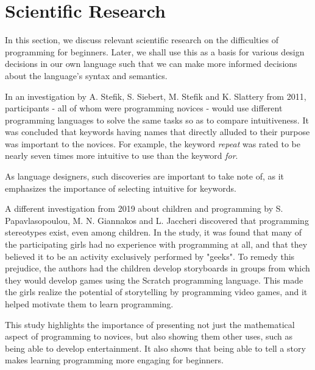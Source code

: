 \section{Scientific Research} \label{sec:scientific_research}
In this section, we discuss relevant scientific research on the difficulties of programming for beginners.
Later, we shall use this as a basis for various design decisions in our own language such that we can make more 
informed decisions about the language's syntax and semantics.

In an investigation by A. Stefik, S. Siebert, M. Stefik and K. Slattery from 2011, participants - all of whom were
programming novices - would use different programming languages to solve the same tasks so as to compare intuitiveness. 
It was concluded that keywords having names that directly alluded to their purpose was important to the novices. 
For example, the keyword \emph{repeat} was rated to be nearly seven times more intuitive to use than the keyword \emph{for}\cite{stefik_empirical_2011}.

\noindent
As language designers, such discoveries are important to take note of, as it emphasizes the importance of selecting intuitive for keywords.

A different investigation from 2019 about children and programming by S. Papavlasopoulou, M. N. Giannakos and L. Jaccheri discovered that 
programming stereotypes exist, even among children. 
In the study, it was found that many of the participating girls had no experience with programming at all, and that they believed it 
to be an activity exclusively performed by "geeks". 
To remedy this prejudice, the authors had the children develop storyboards in groups from which they would develop games using the 
Scratch programming language. 
This made the girls realize the potential of storytelling by programming video games, and it helped motivate them to learn programming\cite{papavlasopoulou_exploring_2019}.

\noindent
This study highlights the importance of presenting not just the mathematical aspect of programming to novices, but also 
showing them other uses, such as being able to develop entertainment. 
It also shows that being able to tell a story makes learning programming more engaging for beginners.


